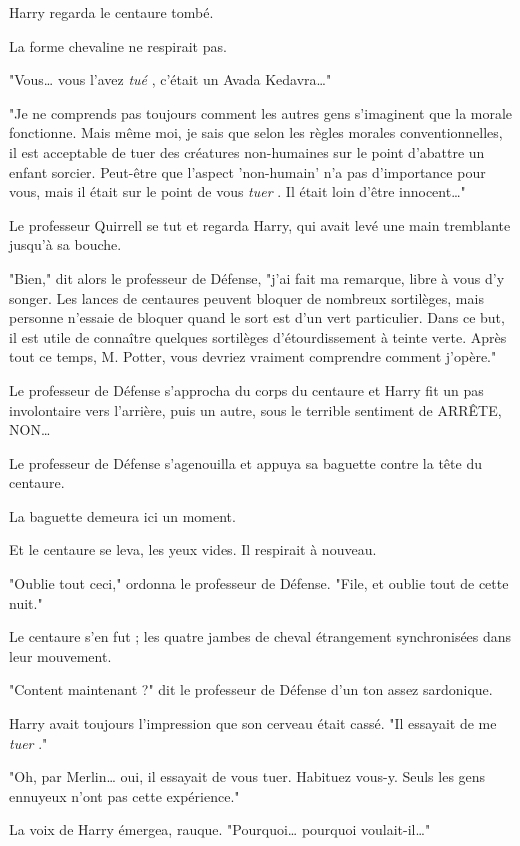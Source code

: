 Harry regarda le centaure tombé.

La forme chevaline ne respirait pas.

"Vous… vous l'avez \emph{tué} , c'était un Avada Kedavra…"

"Je ne comprends pas toujours comment les autres gens s'imaginent que la morale fonctionne. Mais même moi, je sais que selon les règles morales conventionnelles, il est acceptable de tuer des créatures non-humaines sur le point d'abattre un enfant sorcier. Peut-être que l'aspect 'non-humain' n'a pas d'importance pour vous, mais il était sur le point de vous \emph{tuer} . Il était loin d'être innocent…"

Le professeur Quirrell se tut et regarda Harry, qui avait levé une main tremblante jusqu'à sa bouche.

"Bien," dit alors le professeur de Défense, "j'ai fait ma remarque, libre à vous d'y songer. Les lances de centaures peuvent bloquer de nombreux sortilèges, mais personne n'essaie de bloquer quand le sort est d'un vert particulier. Dans ce but, il est utile de connaître quelques sortilèges d'étourdissement à teinte verte. Après tout ce temps, M. Potter, vous devriez vraiment comprendre comment j'opère."

Le professeur de Défense s'approcha du corps du centaure et Harry fit un pas involontaire vers l'arrière, puis un autre, sous le terrible sentiment de ARRÊTE, NON…

Le professeur de Défense s'agenouilla et appuya sa baguette contre la tête du centaure.

La baguette demeura ici un moment.

Et le centaure se leva, les yeux vides. Il respirait à nouveau.

"Oublie tout ceci," ordonna le professeur de Défense. "File, et oublie tout de cette nuit."

Le centaure s'en fut ; les quatre jambes de cheval étrangement synchronisées dans leur mouvement.

"Content maintenant ?" dit le professeur de Défense d'un ton assez sardonique.

Harry avait toujours l'impression que son cerveau était cassé. "Il essayait de me \emph{tuer} ."

"Oh, par Merlin… oui, il essayait de vous tuer. Habituez vous-y. Seuls les gens ennuyeux n'ont pas cette expérience."

La voix de Harry émergea, rauque. "Pourquoi… pourquoi voulait-il…"

